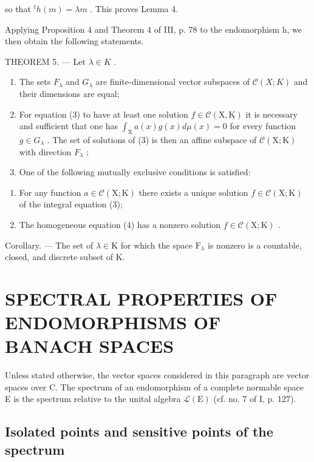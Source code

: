 so that \({}^{t}h(m)=\lambda m\) . This proves Lemma 4.

Applying Proposition 4 and Theorem 4 of III, p. 78 to the endomorphism h, we then obtain the following statements.

THEOREM 5. --- Let \(\lambda\in K\) .

\begin{enumerate}
\def\labelenumi{\alph{enumi})}
\item
  The sets \(F_{\lambda}\) and \(G_{\lambda}\) are finite-dimensional vector subspaces of \(\mathcal{C}(X;K)\) and their dimensions are equal;
\item
  For equation (3) to have at least one solution \(f \in \mathcal{C}(\mathrm{X}, \mathrm{K})\) it is necessary and sufficient that one has \(\int_{\mathrm{X}} a(x) g(x) d\mu(x) = 0\) for every function \(g \in G_{\lambda}\) . The set of solutions of (3) is then an affine subspace of \(\mathcal{C}(\mathrm{X}; \mathrm{K})\) with direction \(F_{\lambda}\) ;
\item
  One of the following mutually exclusive conditions is satisfied:
\end{enumerate}

\begin{enumerate}
\def\labelenumi{(\roman{enumi})}
\item
  For any function \(a \in \mathcal{C}(\mathrm{X};\mathrm{K})\) there exists a unique solution \(f \in \mathcal{C}(\mathrm{X};\mathrm{K})\) of the integral equation (3);
\item
  The homogeneous equation (4) has a nonzero solution \(f \in \mathcal{C}(\mathrm{X};\mathrm{K})\) .
\end{enumerate}

Corollary. --- The set of \(\lambda\in\mathrm{K}\) for which the space \(\mathrm{F}_{\lambda}\) is nonzero is a countable, closed, and discrete subset of K.

\section{SPECTRAL PROPERTIES OF ENDOMORPHISMS OF BANACH SPACES}

Unless stated otherwise, the vector spaces considered in this paragraph are vector spaces over C. The spectrum of an endomorphism of a complete normable space E is the spectrum relative to the unital algebra \(\mathcal{L}(\mathrm{E})\) (cf. no. 7 of I, p. 127).

\subsection{Isolated points and sensitive points of the spectrum}

